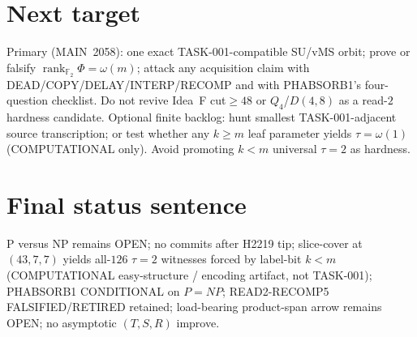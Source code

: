 \documentclass[11pt]{article}
\begin{document}
\section*{Next target}
Primary (MAIN~2058): one exact TASK-001-compatible SU/vMS orbit; prove or falsify
$\operatorname{rank}_{\mathbb F_2}\Phi=\omega(m)$; attack any acquisition claim with
DEAD/COPY/DELAY/INTERP/RECOMP and with PHABSORB1's four-question checklist.
Do not revive Idea~F cut$\ge48$ or $Q_4$/$D(4,8)$ as a read-$2$ hardness candidate.
Optional finite backlog: hunt smallest TASK-001-adjacent source transcription;
or test whether any $k\ge m$ leaf parameter yields $\tau=\omega(1)$ (COMPUTATIONAL only).
Avoid promoting $k{<}m$ universal $\tau{=}2$ as hardness.

\section*{Final status sentence}
P versus NP remains OPEN; no commits after H2219 tip; slice-cover at $(43,7,7)$
yields all-$126$ $\tau{=}2$ witnesses forced by label-bit $k{<}m$ (COMPUTATIONAL
easy-structure / encoding artifact, not TASK-001); PHABSORB1 CONDITIONAL on $P=NP$;
READ2-RECOMP5 FALSIFIED/RETIRED retained; load-bearing product-span arrow remains OPEN;
no asymptotic $(T,S,R)$ improve.
\end{document}
